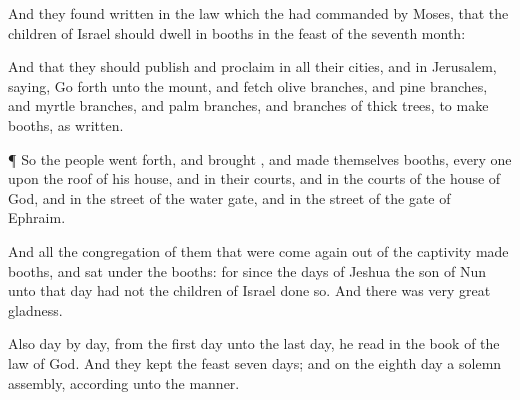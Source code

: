 {And they
found
written in the
law which the
{} had
commanded
by
Moses, that the
children of
Israel should
dwell in
booths in the
feast of the
seventh
month:

And that they should
publish and
proclaim in all their
cities, and in
Jerusalem,
saying, Go
forth unto the
mount, and
fetch
olive
branches, and
pine
branches, and
myrtle
branches, and
palm
branches, and
branches of
thick
trees, to
make
booths, as
{}
written.


\par }{\PP {}¶ So the
people went
forth, and
brought
{}, and
made themselves
booths, every
one upon the roof of his
house, and in their
courts, and in the
courts of the
house of
God, and in the
street of the
water
gate, and in the
street of the
gate of
Ephraim.

And all the
congregation of them that were come
again out of the
captivity
made
booths, and
sat under the
booths: for since the
days of
Jeshua the
son of
Nun unto that
day had not the
children of
Israel done
so. And there was
very
great
gladness.

Also
day by
day, from the
first
day unto the
last
day, he
read in the
book of the
law of
God. And they
kept the
feast
seven
days; and on the
eighth
day
{} a solemn
assembly, according unto the
manner.




\par }
